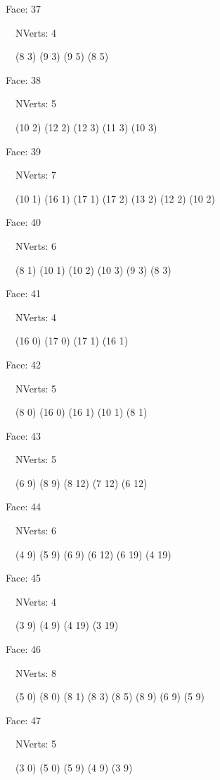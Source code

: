 \documentclass{article}
\begin{document}
{\footnotesize 

Face: 37

\   \    NVerts: 4

 \   \   (8 3) (9 3) (9 5) (8 5)}

{\footnotesize 

Face: 38

\   \    NVerts: 5

 \   \   (10 2) (12 2) (12 3) (11 3) (10 3)}

{\footnotesize 

Face: 39

\   \    NVerts: 7

 \   \   (10 1) (16 1) (17 1) (17 2) (13 2) (12 2) (10 2)}

{\footnotesize 

Face: 40

\   \    NVerts: 6

 \   \   (8 1) (10 1) (10 2) (10 3) (9 3) (8 3)}

{\footnotesize 

Face: 41

\   \    NVerts: 4

 \   \   (16 0) (17 0) (17 1) (16 1)}

{\footnotesize 

Face: 42

\   \    NVerts: 5

 \   \   (8 0) (16 0) (16 1) (10 1) (8 1)}

{\footnotesize 

Face: 43

\   \    NVerts: 5

 \   \   (6 9) (8 9) (8 12) (7 12) (6 12)}

{\footnotesize 

Face: 44

\   \    NVerts: 6

 \   \   (4 9) (5 9) (6 9) (6 12) (6 19) (4 19)}

{\footnotesize 

Face: 45

\   \    NVerts: 4

 \   \   (3 9) (4 9) (4 19) (3 19)}

{\footnotesize 

Face: 46

\   \    NVerts: 8

 \   \   (5 0) (8 0) (8 1) (8 3) (8 5) (8 9) (6 9) (5 9)}

{\footnotesize 

Face: 47

\   \    NVerts: 5

 \   \   (3 0) (5 0) (5 9) (4 9) (3 9)}
\end{document}
